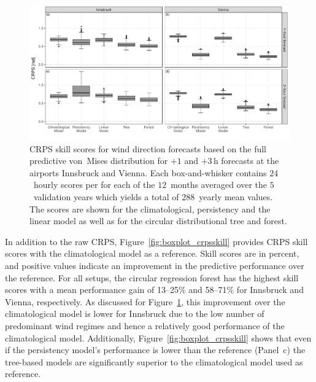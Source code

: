 \documentclass[nojss]{jss}
\numberwithin{equation}{section}
\begin{document}
\begin{figure}[t]
  \centering
  \includegraphics{_plot_circforest_validation_crpsraw_agg_comparison_with_lowff_v14b.pdf}
  \caption{CRPS skill scores for wind direction forecasts based on the full
    predictive von~Mises distribution for $+1$ and $+3$\,h forecasts at the
    airports Innsbruck and Vienna. Each box-and-whisker contains $24$~hourly scores
    per for each of the $12$~months averaged over the $5$~validation years which yields a total of
    $288$~yearly mean values. The scores are shown for the climatological, 
    persistency and the linear model as well as for the circular distributional tree and
    forest.}
  \label{fig:boxplot_crpsraw} 
\end{figure}

In addition to the raw CRPS, Figure~\ref{fig:boxplot_crpsskill} provides CRPS
skill scores with the climatological model as a reference. Skill scores are in
percent, and positive values indicate an improvement in the predictive
performance over the reference. For all setups, the circular regression forest
has the highest skill scores with a mean performance gain of 13--25\% and 58--71\% for
Innsbruck and Vienna, respectively. As discussed for
Figure~\ref{fig:boxplot_crpsraw}, this improvement over the climatological
model is lower for Innsbruck due to the low number of predominant wind regimes
and hence a relatively good performance of the climatological model.
Additionally, Figure~\ref{fig:boxplot_crpsskill} shows that even if the
persistency model's performance is lower than the reference (Panel~c) the
tree-based models are significantly superior to the climatological model used as
reference.
\end{document}
